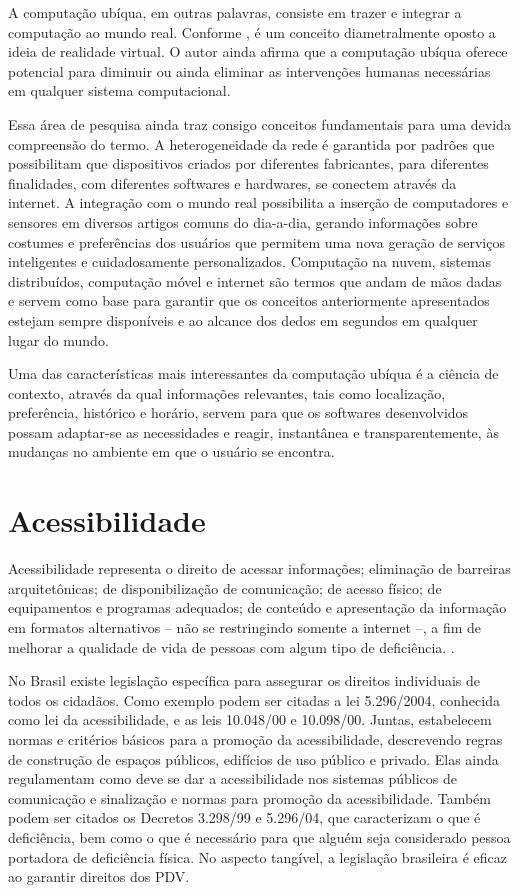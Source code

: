 \documentclass[english,brazilian]{UNISINOSmonografia}
\begin{document}
A computação ubíqua, em outras palavras, consiste em trazer e integrar a computação ao mundo real. Conforme , é um conceito diametralmente oposto a ideia de realidade virtual. O autor ainda afirma que a computação ubíqua oferece potencial para diminuir ou ainda eliminar as intervenções humanas necessárias em qualquer sistema computacional.

Essa área de pesquisa ainda traz consigo conceitos fundamentais para uma devida compreensão do termo. A heterogeneidade da rede é garantida por padrões que possibilitam que dispositivos criados por diferentes fabricantes, para diferentes finalidades, com diferentes softwares e hardwares, se conectem através da internet. A integração com o mundo real possibilita a inserção de computadores e sensores em diversos artigos comuns do dia-a-dia, gerando informações sobre costumes e preferências dos usuários que permitem uma nova geração de serviços inteligentes e cuidadosamente personalizados. Computação na nuvem, sistemas distribuídos, computação móvel e internet são termos que andam de mãos dadas e servem como base para garantir que os conceitos anteriormente apresentados estejam sempre disponíveis e ao alcance dos dedos em segundos em qualquer lugar do mundo.

Uma das características mais interessantes da computação ubíqua é a ciência de contexto, através da qual informações relevantes, tais como localização, preferência, histórico e horário, servem para que os softwares desenvolvidos possam adaptar-se as necessidades e reagir, instantânea e transparentemente, às mudanças no ambiente em que o usuário se encontra.

	\section{Acessibilidade}
Acessibilidade representa o direito de acessar informações; eliminação de barreiras arquitetônicas; de disponibilização de comunicação; de acesso físico; de equipamentos e programas adequados; de conteúdo e apresentação da informação em formatos alternativos – não se restringindo somente a internet –, a fim de melhorar a qualidade de vida de pessoas com algum tipo de deficiência. \cite{AcessibilidadeBrasil}. 

No Brasil existe legislação específica para assegurar os direitos individuais de todos os cidadãos. Como exemplo podem ser citadas a lei 5.296/2004, conhecida como lei da acessibilidade, e as leis 10.048/00 e 10.098/00. Juntas, estabelecem normas e critérios básicos para a promoção da acessibilidade, descrevendo regras de construção de espaços públicos, edifícios de uso público e privado. Elas ainda regulamentam como deve se dar a acessibilidade nos sistemas públicos de comunicação e sinalização e normas para promoção da acessibilidade. Também podem ser citados os Decretos 3.298/99 e 5.296/04, que caracterizam o que é deficiência, bem como o que é necessário para que alguém seja considerado pessoa portadora de deficiência física. No aspecto tangível, a legislação brasileira é eficaz ao garantir direitos dos PDV.
\end{document}
